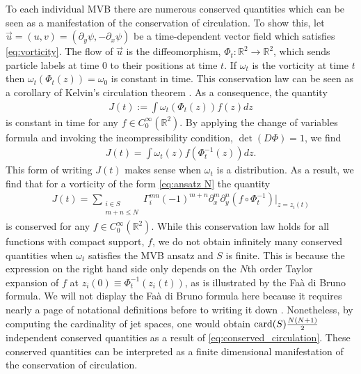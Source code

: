 \documentclass[12pt]{amsart}
\newcommand{\R}{\ensuremath{\mathbb{R}}}
\theoremstyle{remark}
\begin{document}
	To each individual MVB there are numerous conserved quantities which can be seen as a manifestation of the conservation of circulation.
	To show this, let $\vec{u} = (u,v) = (\partial_y \psi, - \partial_x \psi)$ be a time-dependent vector field which satisfies \eqref{eq:vorticity}.
	The flow of $\vec{u}$ is the diffeomorphism, $\Phi_t: \mathbb{R}^2 \to \mathbb{R}^2$,
	which sends particle labels at time $0$ to their positions at time $t$.
	If $\omega_t$ is the vorticity at time $t$ then $\omega_t( \Phi_t(z) ) = \omega_0$ is constant in time.
	This conservation law can be seen as a corollary of Kelvin's circulation theorem \cite{ArnoldKhesin1992}.
	As a consequence, the quantity
	\begin{align*}
		J(t) := \int \omega_t( \Phi_t(z) ) f(z) dz
	\end{align*}
	is constant in time for any $f \in C_0^\infty(\R^2)$.
	By applying the change of variables formula and invoking the
	incompressibility condition, $\det(D\Phi) = 1$, we find
	\begin{align*}
		J(t) = \int \omega_t( z) f(\Phi_t^{-1}(z)) dz.
	\end{align*}
	This form of writing $J(t)$ makes sense when $\omega_t$ is a distribution.
	As a result, we find that for a vorticity of the form \eqref{eq:ansatz N} the quantity
	\begin{align}
		J(t) = \sum_{
			\substack{
				i \in S \\
				m+n \leq N
			}
		} \Gamma_i^{mn} (-1)^{m+n} \partial_x^m\partial_y^n( f \circ \Phi_t^{-1}) |_{z = z_i(t)} \label{eq:conserved_circulation}
	\end{align}
	is conserved for any $f \in C_0^\infty(\R^2)$.
	While this conservation law holds for all functions with compact support, $f$, we do not obtain infinitely many conserved
	quantities when $\omega_t$ satisfies the MVB ansatz and $S$ is finite.
	This is because the expression on the right hand side only depends on the $N$th order Taylor expansion of $f$ at $z_i(0) \equiv \Phi_t^{-1}(z_i(t) )$,
	as is illustrated by the Fa\`a di Bruno formula.
	We will not display the Fa\`a di Bruno formula here because it requires nearly a page of notational definitions before to writing it down
	\cite{ConstantineSavits1996}.
	Nonetheless, by computing the cardinality of jet spaces, one would obtain ${\rm card}(S) \frac{ N(N+1)}{2}$ independent conserved quantities
	as a result of \eqref{eq:conserved_circulation}.
	These conserved quantities can be interpreted as a finite dimensional manifestation of the conservation of circulation.
\end{document}

